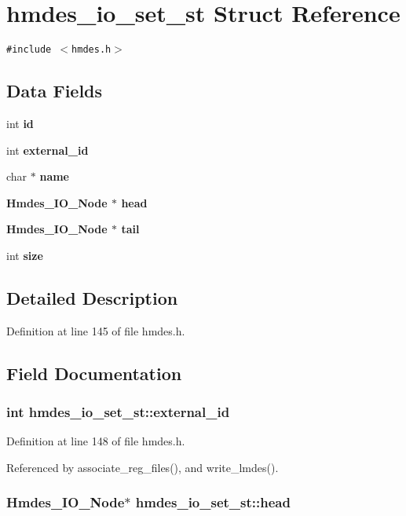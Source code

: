 \section{hmdes\_\-io\_\-set\_\-st Struct Reference}
\label{structhmdes__io__set__st}
{\tt \#include $<$hmdes.h$>$}

\subsection*{Data Fields}
\begin{CompactItemize}
\item 
int \bf{id}
\item 
int \bf{external\_\-id}
\item 
char $\ast$ \bf{name}
\item 
\bf{Hmdes\_\-IO\_\-Node} $\ast$ \bf{head}
\item 
\bf{Hmdes\_\-IO\_\-Node} $\ast$ \bf{tail}
\item 
int \bf{size}
\end{CompactItemize}


\subsection{Detailed Description}




Definition at line 145 of file hmdes.h.

\subsection{Field Documentation}
\subsubsection{\setlength{\rightskip}{0pt plus 5cm}int \bf{hmdes\_\-io\_\-set\_\-st::external\_\-id}}\label{structhmdes__io__set__st_6f539ab30c7e162775e043003d8b750c}




Definition at line 148 of file hmdes.h.

Referenced by associate\_\-reg\_\-files(), and write\_\-lmdes().
\subsubsection{\setlength{\rightskip}{0pt plus 5cm}\bf{Hmdes\_\-IO\_\-Node}$\ast$ \bf{hmdes\_\-io\_\-set\_\-st::head}}\label{structhmdes__io__set__st_4cea398cccec4faf9c0193326f443ed7}




